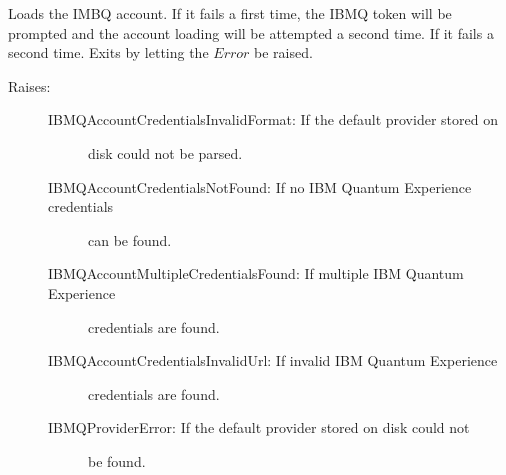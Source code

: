\documentclass[letterpaper,10pt,english]{sphinxmanual}
\begin{document}
\begin{fulllineitems}
\label{\detokenize{run:mermin_on_qiskit.run.load_IBMQ_account}}
Loads the IMBQ account. If it fails a first time, the IBMQ token will be
prompted and the account loading will be attempted a second time. If it fails
a second time. Exits by letting the \(Error\) be raised.
\begin{description}
\item[{Raises:}] \leavevmode\begin{description}
\item[{IBMQAccountCredentialsInvalidFormat: If the default provider stored on}] \leavevmode
disk could not be parsed.

\item[{IBMQAccountCredentialsNotFound: If no IBM Quantum Experience credentials}] \leavevmode
can be found.

\item[{IBMQAccountMultipleCredentialsFound: If multiple IBM Quantum Experience}] \leavevmode
credentials are found.

\item[{IBMQAccountCredentialsInvalidUrl: If invalid IBM Quantum Experience}] \leavevmode
credentials are found.

\item[{IBMQProviderError: If the default provider stored on disk could not}] \leavevmode
be found.

\end{description}

\end{description}

\end{fulllineitems}

\end{document}
